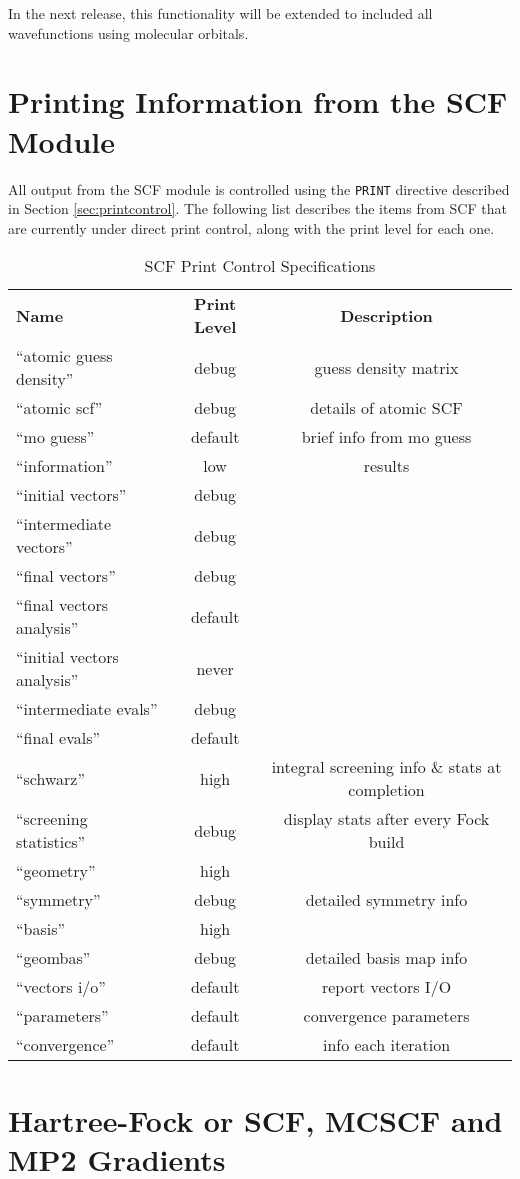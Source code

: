 In the next release, this functionality will be extended to included all
wavefunctions using molecular orbitals.


\newpage
\section{Printing Information from the SCF Module}
\label{sec:scfprint}

All output from the SCF module is controlled using the \verb+PRINT+
directive described in Section \ref{sec:printcontrol}.  The following 
list describes the items from SCF that are currently under direct 
print control, along with the print level for each one.

\begin{table}[htbp]
\begin{center}
\begin{tabular}{lcc}
  {\bf Name}          & {\bf Print Level} & {\bf Description} \\
 ``atomic guess density''     & debug     & guess density matrix \\
 ``atomic scf''               & debug     & details of atomic SCF \\
 ``mo guess''                 & default   & brief info from mo guess \\
 ``information''              & low       & results  \\
 ``initial vectors''          & debug     & \\
 ``intermediate vectors''     & debug     & \\
 ``final vectors''            & debug     & \\
 ``final vectors analysis''   & default   & \\
 ``initial vectors analysis'' & never     & \\
 ``intermediate evals''       & debug     & \\
 ``final evals''              & default   & \\
 ``schwarz''                  & high      & integral screening info \& stats at completion\\
 ``screening statistics''     & debug     & display stats after every Fock build \\
 ``geometry''                 & high      & \\
 ``symmetry''                 & debug     & detailed symmetry info \\
 ``basis''                    & high      & \\
 ``geombas''                  & debug     & detailed basis map info \\
 ``vectors i/o''              & default   & report vectors I/O \\
 ``parameters''               & default   & convergence parameters \\
 ``convergence''              & default   & info each iteration
\end{tabular}
\end{center}
\caption{SCF Print Control Specifications}
\end{table}

\newpage
\section{Hartree-Fock or SCF, MCSCF and MP2 Gradients}



